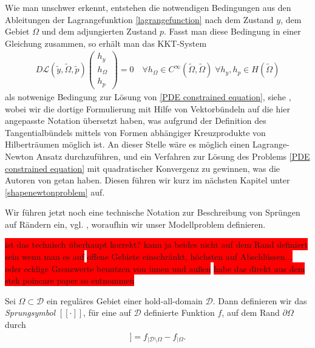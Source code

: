 Wie man unschwer erkennt, entstehen die notwendigen Bedingungen aus den Ableitungen der Lagrangefunktion \ref{lagrangefunction} nach dem Zustand $y$, dem Gebiet $\Omega$ und dem adjungierten Zustand $p$. Fasst man diese Bedingung in einer Gleichung zusammen, so erhält man das KKT-System
\begin{align*}
	D\mathcal{L}(\tilde{y},\tilde{\Omega},\tilde{p})\left(
	\begin{matrix}
	h_y \\
	h_{\Omega} \\
	h_p
	\end{matrix}\right)	 = 0 \quad \forall h_{\Omega} \in C^{\infty}(\tilde{\Omega},\tilde{\Omega})\;
	\forall h_y, h_p \in H(\tilde{\Omega})
\end{align*}
als notwenige Bedingung zur Lösung von \ref{PDE constrained equation}, siehe \cite{LagrangeNewton}, wobei wir die dortige Formulierung mit Hilfe von Vektorbündeln auf die hier angepasste Notation übersetzt haben, was aufgrund der Definition des Tangentialbündels mittels von Formen abhängiger Kreuzprodukte von Hilberträumen  möglich ist. An dieser Stelle wäre es möglich einen Lagrange-Newton Ansatz durchzuführen, und ein Verfahren zur Lösung des Problems \ref{PDE constrained equation} mit quadratischer Konvergenz zu gewinnen, was die Autoren von \cite{LagrangeNewton} getan haben. Diesen führen wir kurz im nächsten Kapitel unter \ref{shapenewtonproblem} auf.

Wir führen jetzt noch eine technische Notation zur Beschreibung von Sprüngen auf Rändern ein, vgl. \cite{LagrangeNewton}, woraufhin wir unser Modellproblem definieren.

\colorbox{red}{ist das technisch überhaupt korrekt? kann ja beides }\newline
\colorbox{red}{nicht auf dem Rand definiert sein wenn man es auf}\newline
\colorbox{red}{ offene Gebiete einschränkt, höchsten auf Abschlüssen... oder ecklige Grenzwerte benutzen von innen und außen}\newline
\colorbox{red}{habe das direkt aus dem stek poincare paper so entnommen}
\begin{defi}
	Sei $\Omega \subset \mathcal{D}$ ein reguläres Gebiet einer hold-all-domain $\mathcal{D}$. Dann definieren wir das \textit{Sprungsymbol} $[[\cdot]]$, für eine auf $\mathcal{D}$ definierte Funktion $f$, auf dem Rand $\partial\Omega$ durch
	\begin{align*}
		[[f]] = f_{\vert \mathcal{D} \setminus \Omega} - f_{\vert \Omega}.
	\end{align*}
\end{defi}

